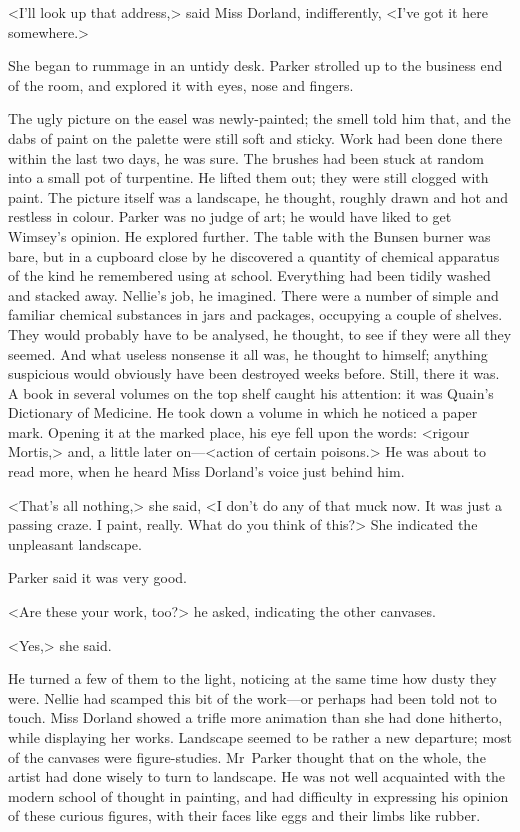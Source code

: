 <I'll look up that address,> said Miss Dorland, indifferently, <I've got it here somewhere.>

She began to rummage in an untidy desk. Parker strolled up to the business end of the room, and explored it with eyes, nose and fingers.

The ugly picture on the easel was newly-painted; the smell told him that, and the dabs of paint on the palette were still soft and sticky. Work had been done there within the last two days, he was sure. The brushes had been stuck at random into a small pot of turpentine. He lifted them out; they were still clogged with paint. The picture itself was a landscape, he thought, roughly drawn and hot and restless in colour. Parker was no judge of art; he would have liked to get Wimsey's opinion. He explored further. The table with the Bunsen burner was bare, but in a cupboard close by he discovered a quantity of chemical apparatus of the kind he remembered using at school. Everything had been tidily washed and stacked away. Nellie's job, he imagined. There were a number of simple and familiar chemical substances in jars and packages, occupying a couple of shelves. They would probably have to be analysed, he thought, to see if they were all they seemed. And what useless nonsense it all was, he thought to himself; anything suspicious would obviously have been destroyed weeks before. Still, there it was. A book in several volumes on the top shelf caught his attention: it was Quain's Dictionary of Medicine. He took down a volume in which he noticed a paper mark. Opening it at the marked place, his eye fell upon the words: <rigour Mortis,> and, a little later on—<action of certain poisons.> He was about to read more, when he heard Miss Dorland's voice just behind him.

<That's all nothing,> she said, <I don't do any of that muck now. It was just a passing craze. I paint, really. What do you think of this?> She indicated the unpleasant landscape.

Parker said it was very good.

<Are these your work, too?> he asked, indicating the other canvases.

<Yes,> she said.

He turned a few of them to the light, noticing at the same time how dusty they were. Nellie had scamped this bit of the work—or perhaps had been told not to touch. Miss Dorland showed a trifle more animation than she had done hitherto, while displaying her works. Landscape seemed to be rather a new departure; most of the canvases were figure-studies. Mr~Parker thought that on the whole, the artist had done wisely to turn to landscape. He was not well acquainted with the modern school of thought in painting, and had difficulty in expressing his opinion of these curious figures, with their faces like eggs and their limbs like rubber.

